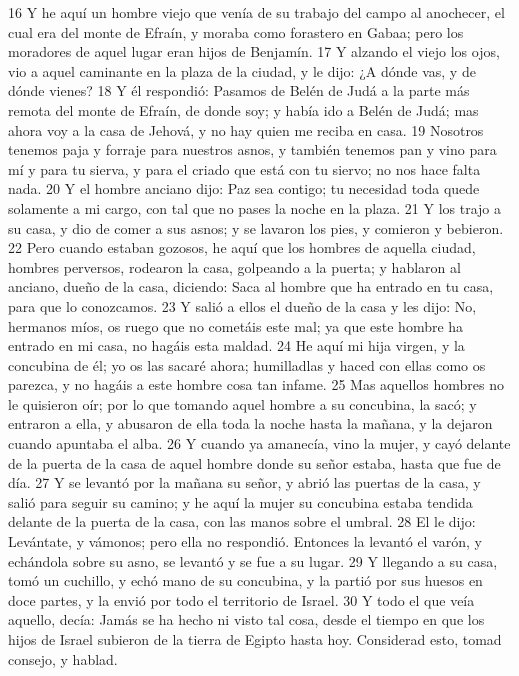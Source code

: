 16 Y he aquí un hombre viejo que venía de su trabajo del campo al anochecer, el cual era del monte de Efraín, y moraba como forastero en Gabaa; pero los moradores de aquel lugar eran hijos de Benjamín.
17 Y alzando el viejo los ojos, vio a aquel caminante en la plaza de la ciudad, y le dijo: ¿A dónde vas, y de dónde vienes?
18 Y él respondió: Pasamos de Belén de Judá a la parte más remota del monte de Efraín, de donde soy; y había ido a Belén de Judá; mas ahora voy a la casa de Jehová, y no hay quien me reciba en casa.
19 Nosotros tenemos paja y forraje para nuestros asnos, y también tenemos pan y vino para mí y para tu sierva, y para el criado que está con tu siervo; no nos hace falta nada.
20 Y el hombre anciano dijo: Paz sea contigo; tu necesidad toda quede solamente a mi cargo, con tal que no pases la noche en la plaza.
21 Y los trajo a su casa, y dio de comer a sus asnos; y se lavaron los pies, y comieron y bebieron.
22 Pero cuando estaban gozosos, he aquí que los hombres de aquella ciudad, hombres perversos, rodearon la casa, golpeando a la puerta; y hablaron al anciano, dueño de la casa, diciendo: Saca al hombre que ha entrado en tu casa, para que lo conozcamos.
23 Y salió a ellos el dueño de la casa y les dijo: No, hermanos míos, os ruego que no cometáis este mal; ya que este hombre ha entrado en mi casa, no hagáis esta maldad.
24 He aquí mi hija virgen, y la concubina de él; yo os las sacaré ahora; humilladlas y haced con ellas como os parezca, y no hagáis a este hombre cosa tan infame.
25 Mas aquellos hombres no le quisieron oír; por lo que tomando aquel hombre a su concubina, la sacó; y entraron a ella, y abusaron de ella toda la noche hasta la mañana, y la dejaron cuando apuntaba el alba.
26 Y cuando ya amanecía, vino la mujer, y cayó delante de la puerta de la casa de aquel hombre donde su señor estaba, hasta que fue de día.
27 Y se levantó por la mañana su señor, y abrió las puertas de la casa, y salió para seguir su camino; y he aquí la mujer su concubina estaba tendida delante de la puerta de la casa, con las manos sobre el umbral.
28 El le dijo: Levántate, y vámonos; pero ella no respondió. Entonces la levantó el varón, y echándola sobre su asno, se levantó y se fue a su lugar.
29 Y llegando a su casa, tomó un cuchillo, y echó mano de su concubina, y la partió por sus huesos en doce partes, y la envió por todo el territorio de Israel.
30 Y todo el que veía aquello, decía: Jamás se ha hecho ni visto tal cosa, desde el tiempo en que los hijos de Israel subieron de la tierra de Egipto hasta hoy. Considerad esto, tomad consejo, y hablad.

